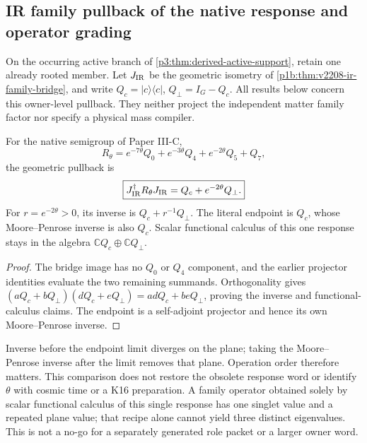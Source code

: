 \documentclass[12pt,a4paper]{article}
\begin{document}
\subsection{IR family pullback of the native response and operator grading}
\label{p3c:sec:v2208-ir-family-response}
On the occurring active branch of \ref{p3:thm:derived-active-support},
retain one already rooted member. Let $J_{\rm IR}$ be the geometric
isometry of \ref{p1b:thm:v2208-ir-family-bridge}, and write
$Q_c=|c\rangle\langle c|$, $Q_\perp=I_G-Q_c$.
All results below concern this owner-level pullback. They neither project
the independent matter family factor nor specify a physical mass compiler.

\begin{proposition}
\label{p3c:prop:v2208-preterminal-response}
For the native semigroup of Paper III-C,
\[
 R_\theta=e^{-7\theta}Q_0+e^{-3\theta}Q_4
              +e^{-2\theta}Q_5+Q_7,
\]
the geometric pullback is
\[
 \boxed{J_{\rm IR}^\dagger R_\theta J_{\rm IR}
        =Q_c+e^{-2\theta}Q_\perp.}
\]
For $r=e^{-2\theta}>0$, its inverse is $Q_c+r^{-1}Q_\perp$.
The literal endpoint is $Q_c$, whose Moore--Penrose inverse is also $Q_c$.
Scalar functional calculus of this one response stays in the algebra
$\mathbb C Q_c\oplus\mathbb C Q_\perp$.
\end{proposition}
\begin{proof}
The bridge image has no $Q_0$ or $Q_4$ component, and the earlier projector
identities evaluate the two remaining summands. Orthogonality gives
$(aQ_c+bQ_\perp)(dQ_c+eQ_\perp)=adQ_c+beQ_\perp$, proving the inverse
and functional-calculus claims. The endpoint is a self-adjoint projector
and hence its own Moore--Penrose inverse.
\end{proof}
Inverse before the endpoint limit diverges on the plane; taking the
Moore--Penrose inverse after the limit removes that plane. Operation order
therefore matters. This comparison does not restore the obsolete response
word or identify $\theta$ with cosmic time or a K16 preparation.
A family operator obtained solely by scalar functional calculus of this
single response has one singlet value and a repeated plane value; that
recipe alone cannot yield three distinct eigenvalues. This is not a
no-go for a separately generated role packet or a larger owner word.
\end{document}
